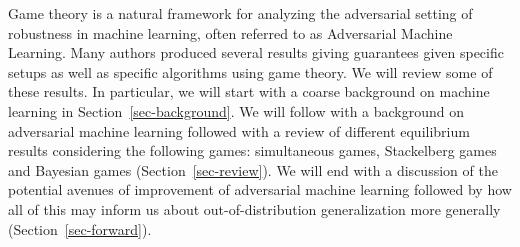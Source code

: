 Game theory is a natural framework for analyzing the adversarial setting of robustness in machine learning, often referred to as Adversarial Machine Learning. Many authors produced several results giving guarantees given specific setups as well as specific algorithms using game theory. We will review some of these results. In particular, we will start with a coarse background on machine learning in Section~\ref{sec-background}. We will follow with a background on adversarial machine learning followed with a review of different equilibrium results considering the following games: simultaneous games, Stackelberg games and Bayesian games (Section~\ref{sec-review}). We will end with a discussion of the potential avenues of improvement of adversarial machine learning followed by how all of this may inform us about out-of-distribution generalization more generally (Section~\ref{sec-forward}).